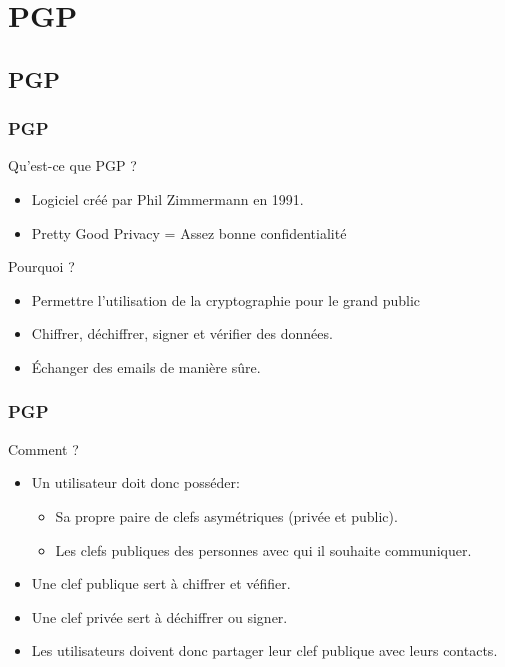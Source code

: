 \section{PGP}
\subsection{PGP}
\begin{frame}
    \frametitle{\color{white}PGP}
    \begin{block}{Qu'est-ce que PGP ?}
      \begin{itemize}
       \item Logiciel créé par Phil Zimmermann en 1991.
         \item Pretty Good Privacy = Assez bonne confidentialité
       \end{itemize} 
    \end{block}
    \begin{block}{Pourquoi ?}
      \begin{itemize}
         \item Permettre l'utilisation de la cryptographie pour le grand public
         \item Chiffrer, déchiffrer, signer et vérifier des données. 
         \item Échanger des emails de manière sûre.
       \end{itemize} 
    \end{block}
\end{frame}
\begin{frame}
    \frametitle{\color{white}PGP}
    \begin{block}{Comment ?}
    	\begin{itemize}
         \item Un utilisateur doit donc posséder:
	  \begin{itemize}
	    \item Sa propre paire de clefs asymétriques (privée et public).
	    \item Les clefs publiques des personnes avec qui il souhaite communiquer. 
	  \end{itemize}
	 \item Une clef publique sert à chiffrer et véfifier.
	 \item Une clef privée sert à déchiffrer ou signer.
	 \item Les utilisateurs doivent donc partager leur clef publique avec leurs contacts.
       \end{itemize} 
    \end{block}
\end{frame}

